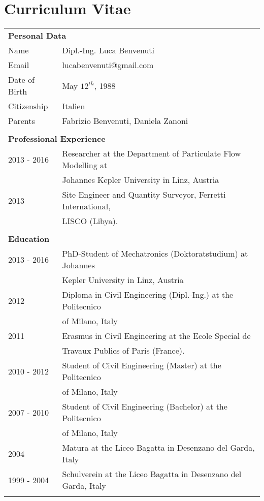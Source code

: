 \chapter*{Curriculum Vitae}

\setlength\extrarowheight{5pt}

\begin{longtable}[t]{ll}
	\multicolumn{2}{l}{\textbf{\Large Personal Data}} \\
	Name & Dipl.-Ing. Luca Benvenuti \\
	Email & lucabenvenuti@gmail.com \\
	Date of Birth & May $12^{th}$, 1988 \\
	Citizenship & Italien \\
	Parents & Fabrizio Benvenuti, Daniela Zanoni \\
	\vspace*{1ex} \\ 
	\multicolumn{2}{l}{\textbf{\Large Professional Experience}} \\
	2013 - 2016 & Researcher at the Department of Particulate Flow Modelling at \\
				&		Johannes Kepler University in Linz, Austria \\
	2013 		& Site Engineer and Quantity Surveyor, Ferretti International, \\
		 		& LISCO (Libya). \\
	\vspace*{1ex} \\
	\multicolumn{2}{l}{\textbf{\Large Education}} \\
	2013 - 2016 & PhD-Student of Mechatronics (Doktoratstudium) at Johannes \\
				& Kepler University in Linz, Austria \\
	2012 		& Diploma in Civil Engineering (Dipl.-Ing.) at the Politecnico \\
				& of Milano, Italy \\
	2011		& Erasmus in Civil Engineering at the Ecole Special de \\
				& Travaux Publics of Paris (France). \\
	2010 - 2012 & Student of Civil Engineering (Master) at the Politecnico \\
				& of Milano, Italy \\
	2007 - 2010 & Student of Civil Engineering (Bachelor) at the Politecnico \\
				& of Milano, Italy \\				
	2004 		& Matura at the Liceo Bagatta in Desenzano del Garda, Italy \\
	1999 - 2004 & Schulverein at the Liceo Bagatta in Desenzano del Garda, Italy \\	
	\vspace*{1ex} \\
\end{longtable}
